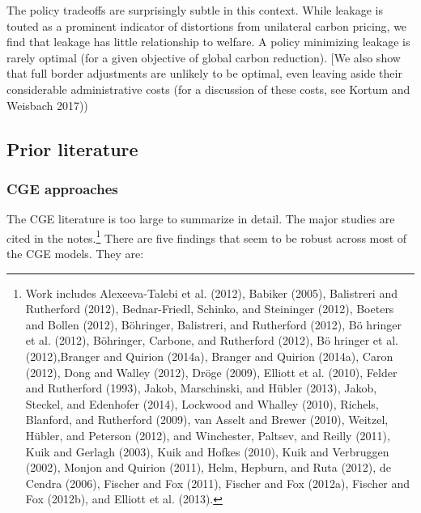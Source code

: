 \documentclass[notitlepage,12pt]{article}
\begin{document}
The policy tradeoffs are surprisingly subtle in this context. While leakage
is touted as a prominent indicator of distortions from unilateral carbon
pricing, we find that leakage has little relationship to welfare. A policy
minimizing leakage is rarely optimal (for a given objective of global carbon
reduction). [We also show that full border adjustments are unlikely to be
optimal, even leaving aside their considerable administrative costs (for a
discussion of these costs, see Kortum and Weisbach 2017)) 

\subsection{Prior literature}

\subsubsection{CGE approaches}

The CGE literature is too large to summarize in detail. The major studies
are cited in the notes.\footnote{%
Work includes Alexeeva-Talebi et al. (2012), Babiker (2005), Balistreri and
Rutherford (2012), Bednar-Friedl, Schinko, and Steininger (2012), Boeters
and Bollen (2012), B\"{o}hringer, Balistreri, and Rutherford (2012), B\"{o}%
hringer et al. (2012), B\"{o}hringer, Carbone, and Rutherford (2012), B\"{o}%
hringer et al. (2012),Branger and Quirion (2014a), Branger and Quirion
(2014a), Caron (2012), Dong and Walley (2012), Dr\"{o}ge (2009), Elliott et
al. (2010), Felder and Rutherford (1993), Jakob, Marschinski, and H\"{u}bler
(2013), Jakob, Steckel, and Edenhofer (2014), Lockwood and Whalley (2010),
Richels, Blanford, and Rutherford (2009), van Asselt and Brewer (2010),
Weitzel, H\"{u}bler, and Peterson (2012), and Winchester, Paltsev, and
Reilly (2011), Kuik and Gerlagh (2003), Kuik and Hofkes (2010), Kuik and
Verbruggen (2002), Monjon and Quirion (2011), Helm, Hepburn, and Ruta
(2012), de Cendra (2006), Fischer and Fox (2011), Fischer and Fox (2012a),
Fischer and Fox (2012b), and Elliott et al. (2013).} There are five findings
that seem to be robust across most of the CGE models. They are:
\end{document}
